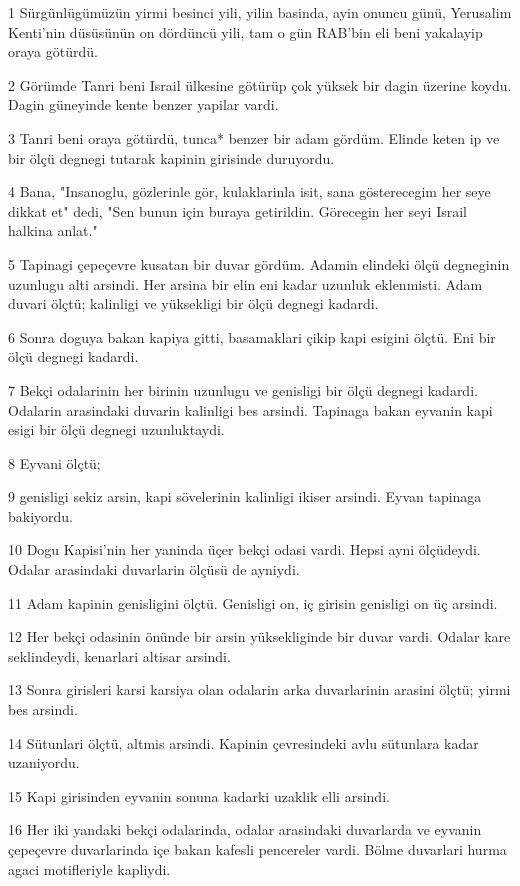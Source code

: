 \par 1 Sürgünlügümüzün yirmi besinci yili, yilin basinda, ayin onuncu günü, Yerusalim Kenti'nin düsüsünün on dördüncü yili, tam o gün RAB'bin eli beni yakalayip oraya götürdü.
\par 2 Görümde Tanri beni Israil ülkesine götürüp çok yüksek bir dagin üzerine koydu. Dagin güneyinde kente benzer yapilar vardi.
\par 3 Tanri beni oraya götürdü, tunca* benzer bir adam gördüm. Elinde keten ip ve bir ölçü degnegi tutarak kapinin girisinde duruyordu.
\par 4 Bana, "Insanoglu, gözlerinle gör, kulaklarinla isit, sana gösterecegim her seye dikkat et" dedi, "Sen bunun için buraya getirildin. Görecegin her seyi Israil halkina anlat."
\par 5 Tapinagi çepeçevre kusatan bir duvar gördüm. Adamin elindeki ölçü degneginin uzunlugu alti arsindi. Her arsina bir elin eni kadar uzunluk eklenmisti. Adam duvari ölçtü; kalinligi ve yüksekligi bir ölçü degnegi kadardi.
\par 6 Sonra doguya bakan kapiya gitti, basamaklari çikip kapi esigini ölçtü. Eni bir ölçü degnegi kadardi.
\par 7 Bekçi odalarinin her birinin uzunlugu ve genisligi bir ölçü degnegi kadardi. Odalarin arasindaki duvarin kalinligi bes arsindi. Tapinaga bakan eyvanin kapi esigi bir ölçü degnegi uzunluktaydi.
\par 8 Eyvani ölçtü;
\par 9 genisligi sekiz arsin, kapi sövelerinin kalinligi ikiser arsindi. Eyvan tapinaga bakiyordu.
\par 10 Dogu Kapisi'nin her yaninda üçer bekçi odasi vardi. Hepsi ayni ölçüdeydi. Odalar arasindaki duvarlarin ölçüsü de ayniydi.
\par 11 Adam kapinin genisligini ölçtü. Genisligi on, iç girisin genisligi on üç arsindi.
\par 12 Her bekçi odasinin önünde bir arsin yüksekliginde bir duvar vardi. Odalar kare seklindeydi, kenarlari altisar arsindi.
\par 13 Sonra girisleri karsi karsiya olan odalarin arka duvarlarinin arasini ölçtü; yirmi bes arsindi.
\par 14 Sütunlari ölçtü, altmis arsindi. Kapinin çevresindeki avlu sütunlara kadar uzaniyordu.
\par 15 Kapi girisinden eyvanin sonuna kadarki uzaklik elli arsindi.
\par 16 Her iki yandaki bekçi odalarinda, odalar arasindaki duvarlarda ve eyvanin çepeçevre duvarlarinda içe bakan kafesli pencereler vardi. Bölme duvarlari hurma agaci motifleriyle kapliydi.
